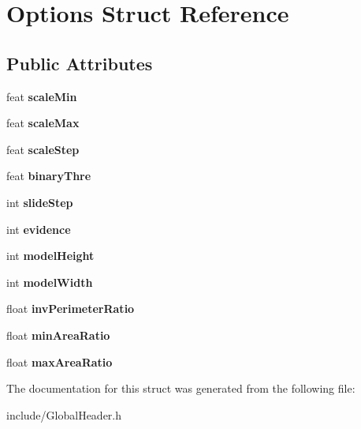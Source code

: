 \hypertarget{structOptions}{}\section{Options Struct Reference}
\label{structOptions}
\subsection*{Public Attributes}
\begin{DoxyCompactItemize}
\item 
\hypertarget{structOptions_affdfe3fdb610773968554bc1a80176dd}{}feat {\bfseries scale\+Min}\label{structOptions_affdfe3fdb610773968554bc1a80176dd}

\item 
\hypertarget{structOptions_a0652a70e49763e95db9f61f2f70f7bf7}{}feat {\bfseries scale\+Max}\label{structOptions_a0652a70e49763e95db9f61f2f70f7bf7}

\item 
\hypertarget{structOptions_adb2992a2cc6928303de986d7a1052a00}{}feat {\bfseries scale\+Step}\label{structOptions_adb2992a2cc6928303de986d7a1052a00}

\item 
\hypertarget{structOptions_aa7e47c7146ac77408d3ab3a8028185fd}{}feat {\bfseries binary\+Thre}\label{structOptions_aa7e47c7146ac77408d3ab3a8028185fd}

\item 
\hypertarget{structOptions_a802f1830b28814d67ba43b69e2549910}{}int {\bfseries slide\+Step}\label{structOptions_a802f1830b28814d67ba43b69e2549910}

\item 
\hypertarget{structOptions_a96a28ee7a8e6655bce8cdf47f0d3f64a}{}int {\bfseries evidence}\label{structOptions_a96a28ee7a8e6655bce8cdf47f0d3f64a}

\item 
\hypertarget{structOptions_a28c5d1648f5bf5c9e9461a59262a6e13}{}int {\bfseries model\+Height}\label{structOptions_a28c5d1648f5bf5c9e9461a59262a6e13}

\item 
\hypertarget{structOptions_a06b085d0c70d1e423b85b7e9db5fd9fc}{}int {\bfseries model\+Width}\label{structOptions_a06b085d0c70d1e423b85b7e9db5fd9fc}

\item 
\hypertarget{structOptions_ae412ce0aa974ad8ce47b65d1ec581317}{}float {\bfseries inv\+Perimeter\+Ratio}\label{structOptions_ae412ce0aa974ad8ce47b65d1ec581317}

\item 
\hypertarget{structOptions_a93bd7acdd3ffe585fe0cd7d8db629bb0}{}float {\bfseries min\+Area\+Ratio}\label{structOptions_a93bd7acdd3ffe585fe0cd7d8db629bb0}

\item 
\hypertarget{structOptions_ac0f2ee6436490e03ea9ddd105b4329a3}{}float {\bfseries max\+Area\+Ratio}\label{structOptions_ac0f2ee6436490e03ea9ddd105b4329a3}

\end{DoxyCompactItemize}


The documentation for this struct was generated from the following file\+:\begin{DoxyCompactItemize}
\item 
include/Global\+Header.\+h\end{DoxyCompactItemize}
